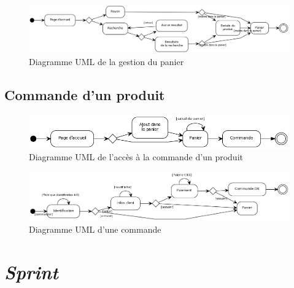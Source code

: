 \documentclass[12pt]{article}
\begin{document}
\begin{figure}[ht]
    \center
    \includegraphics[scale=0.4]{../Diagrams/ActivityDiagrams/panier.png}
    \caption*{Diagramme UML de la gestion du panier}
\end{figure}

\subsection{Commande d'un produit}

\begin{figure}[ht]
    \center
    \includegraphics[scale=0.55]{../Diagrams/ActivityDiagrams/commande_global.png}
    \caption*{Diagramme UML de l'accès à la commande d'un produit}
\end{figure}

\begin{figure}[ht]
    \center
    \includegraphics[scale=0.45]{../Diagrams/ActivityDiagrams/commande_en_cours.png}
    \caption*{Diagramme UML d'une commande}
\end{figure}

\section{\textit{Sprint}}
\end{document}
